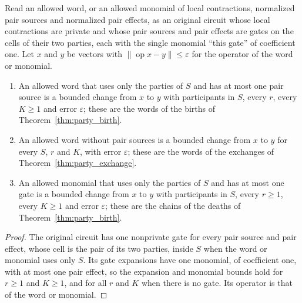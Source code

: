 \begin{theorem}
    \label{thm:party_resources_bounded}
    \leanok
    Read an allowed word, or an allowed monomial of local contractions, normalized pair sources
    and normalized pair effects, as an original circuit whose local contractions are private and
    whose pair sources and pair effects are gates on the cells of their two parties, each with the
    single monomial ``this gate'' of coefficient one. Let $x$ and $y$ be vectors with
    $\lVert\operatorname{op}x-y\rVert\leq\varepsilon$ for the operator of the word or
    monomial.
    \begin{enumerate}
        \item An allowed word that uses only the parties of $S$ and has at most one pair source is
              a bounded change from $x$ to $y$ with participants in $S$, every $r$, every
              $K\geq1$ and error $\varepsilon$; these are the words of the births of
              Theorem~\ref{thm:party_birth}.
        \item An allowed word without pair sources is a bounded change from $x$ to $y$ for every
              $S$, $r$ and $K$, with error $\varepsilon$; these are the words of the exchanges of
              Theorem~\ref{thm:party_exchange}.
        \item An allowed monomial that uses only the parties of $S$ and has at most one gate is a
              bounded change from $x$ to $y$ with participants in $S$, every $r\geq1$, every
              $K\geq1$ and error $\varepsilon$; these are the chains of the deaths of
              Theorem~\ref{thm:party_birth}.
    \end{enumerate}
\end{theorem}
\begin{proof}\leanok
    The original circuit has one nonprivate gate for every pair source and pair effect, whose
    cell is the pair of its two parties, inside $S$ when the word or monomial uses only $S$. Its
    gate expansions have one monomial, of coefficient one, with at most one pair effect, so the
    expansion and monomial bounds hold for $r\geq1$ and $K\geq1$, and for all $r$ and $K$ when
    there is no gate. Its operator is that of the word or monomial.
\end{proof}

